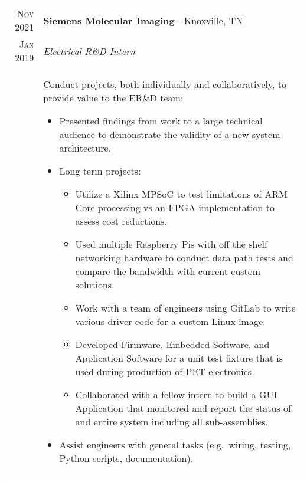 \documentclass[a4paper,12pt]{article}
\begin{document}
%
%
\begin{tabularx}{\textwidth}{r|X}
   \textsc{Nov 2021} & \textbf{Siemens Molecular Imaging} \-- Knoxville, TN\\
   \textsc{Jan 2019} & \emph{Electrical R\&D Intern}\\
   & \small{Conduct projects, both individually and collaboratively, to provide value to the ER\&D team:
      \begin{itemize}[leftmargin=20pt,topsep=1pt,itemsep=1pt,partopsep=0pt, parsep=1pt]
         \item Presented findings from work to a large technical audience to demonstrate the validity of a new system architecture.
         \item Long term projects:
            \begin{itemize}[leftmargin=20pt,topsep=1pt,itemsep=1pt,partopsep=0pt, parsep=1pt]
               \item Utilize a Xilinx MPSoC to test limitations of ARM Core processing vs an FPGA implementation to assess cost reductions.
               \item Used multiple Raspberry Pis with off the shelf networking hardware to conduct data path tests and compare the bandwidth with current custom solutions.
               \item Work with a team of engineers using GitLab to write various driver code for a custom Linux image.
               \item Developed Firmware, Embedded Software, and Application Software for a unit test fixture that is used during production of PET electronics.
               \item Collaborated with a fellow intern to build a GUI Application that monitored and report the status of and entire system including all sub-assemblies.
            \end{itemize}
         \item Assist engineers with general tasks (e.g.\ wiring, testing, Python scripts, documentation).
      \vspace{-0.5cm}
      \end{itemize}}\\
\end{tabularx}

\end{document}
